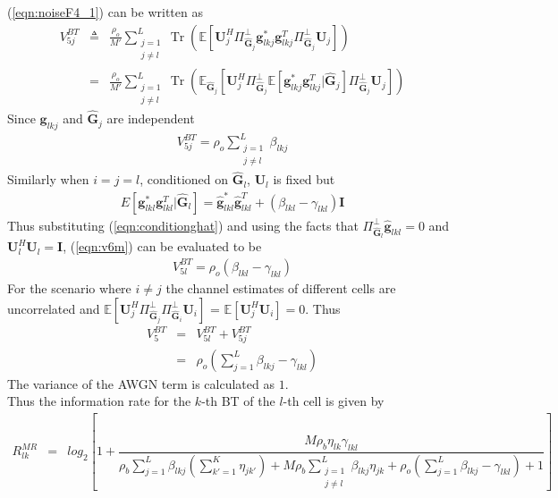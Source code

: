 \documentclass[10pt, a4paper, twoside,fleqn]{article}
\DeclareMathOperator{\Tr}{Tr}
\begin{document}
(\ref{eqn:noiseF4_1}) can be written as 
\begin{eqnarray}\label{eqn:v6m}
V_{5j}^{BT}&\triangleq& \frac{\rho_o}{M'}\sum\limits_{\substack{j=1 \\ j \neq l}}^{L} \Tr\left(\mathbb{E}\left[\pmb{U}_j^H \Pi^{\perp}_{\pmb{\widehat{G}}_j} \pmb{g}_{lkj}^* \pmb{g}_{lkj}^{T}\Pi^{\perp}_{\pmb{\widehat{G}}_j} \pmb{U}_j \right]\right) \nonumber \\
           &=& \frac{\rho_o}{M'}\sum_{\substack{j=1 \\ j \neq l}}^{L}\Tr\left(\mathbb{E}_{\pmb{\widehat{G}}_j}\left[\pmb{U}_j^H \Pi^{\perp}_{\pmb{\widehat{G}}_j} \mathbb{E}[\pmb{g}_{lkj}^* \pmb{g}_{lkj}^{T} | \pmb{\widehat{G}}_j]\Pi^{\perp}_{\pmb{\widehat{G}}_j} \pmb{U}_j \right]\right)
\end{eqnarray}
Since $\pmb{g}_{lkj}$ and $\pmb{\widehat{G}}_j$ are independent
\begin{eqnarray}\label{eqn:v6neql}
V_{5j}^{BT} = \rho_o\sum\limits_{\substack{j=1 \\ j \neq l}}^{L}\beta_{lkj}
\end{eqnarray}
Similarly when $i=j=l$, conditioned on $\pmb{\widehat{G}}_l$, $\pmb{U}_l$ is fixed but
\begin{eqnarray}\label{eqn:conditionghat}
E[\pmb{g}_{lkl}^*\pmb{g}_{lkl}^T|\pmb{\widehat{G}}_l] = \pmb{\hat g}_{lkl}^*\pmb{\hat g}_{lkl}^T + (\beta_{lkl}-\gamma_{lkl})\pmb{I}
\end{eqnarray}
Thus substituting (\ref{eqn:conditionghat}) and using the facts that $\Pi^{\perp}_{\pmb{\widehat{G}}_l}\pmb{\hat g}_{lkl} = 0$ and $\pmb{U}_l^H\pmb{U}_l=\pmb{I}$, (\ref{eqn:v6m}) can be evaluated to be
\begin{eqnarray}\label{eqn:v6l}
V_{5l}^{BT}= \rho_o(\beta_{lkl} -\gamma_{lkl})
\end{eqnarray}
For the scenario where $i\neq j$ the channel estimates of different cells are uncorrelated and $\mathbb{E}\left[\pmb{U}_j^H\Pi^{\perp}_{\pmb{\widehat{G}}_j}\Pi^{\perp}_{\pmb{\widehat{G}}_i} \pmb{U}_i\right]$ = $\mathbb{E}[\pmb{U}_j^H\pmb{U}_i] =0$. Thus
\begin{eqnarray}\label{eqn:v6}
   V_5^{BT} &=& V_{5l}^{BT} + V_{5j}^{BT} \nonumber \\ &=&\rho_o\left(\sum\limits_{j=1}^{L}\beta_{lkj}-\gamma_{lkl}\right)
\end{eqnarray}
The variance of the AWGN term is calculated as $1$.\\
Thus the information rate for the $k$-th BT of the $l$-th cell is given by
\begin{eqnarray}\label{eqn:rateotwitheta}
R_{lk}^{MR} &=& log_2\left[1+\dfrac{M\rho_b\eta_{lk}\gamma_{lkl}}{ \rho_b\sum\limits_{j=1}^{L}\beta_{lkj}\left(\sum\limits_{k'=1}^K\eta_{jk'}\right) +M\rho_b\sum\limits_{\substack{j=1 \\ j \neq l}}^{L}\beta_{lkj}\eta_{jk} +\rho_o\left(\sum\limits_{j=1}^{L}\beta_{lkj} -\gamma_{lkl}\right)+1}\right]
\end{eqnarray}
\end{document}
